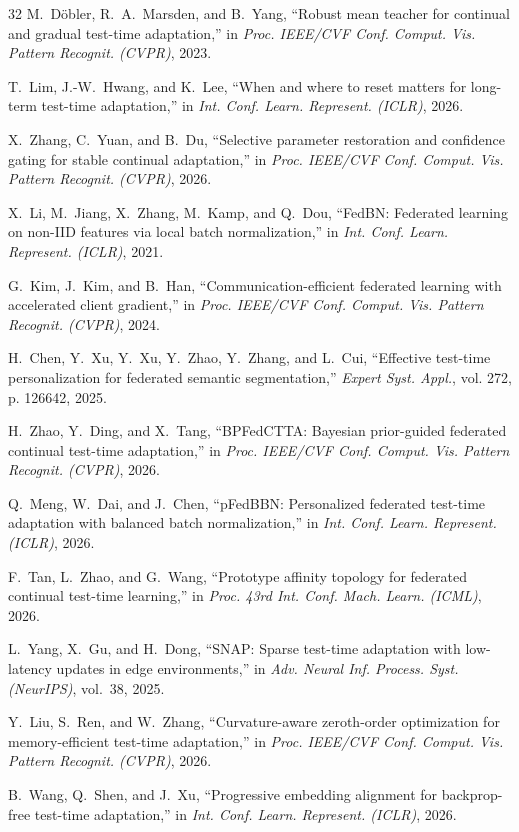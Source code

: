 \documentclass[journal]{IEEEtran}
\begin{document}
\begin{thebibliography}{32}
M.~D{\"o}bler, R.~A.~Marsden, and B.~Yang, ``Robust mean teacher for continual and gradual test-time adaptation,'' in \emph{Proc. IEEE/CVF Conf. Comput. Vis. Pattern Recognit. (CVPR)}, 2023.

T.~Lim, J.-W.~Hwang, and K.~Lee, ``When and where to reset matters for long-term test-time adaptation,'' in \emph{Int. Conf. Learn. Represent. (ICLR)}, 2026.

X.~Zhang, C.~Yuan, and B.~Du, ``Selective parameter restoration and confidence gating for stable continual adaptation,'' in \emph{Proc. IEEE/CVF Conf. Comput. Vis. Pattern Recognit. (CVPR)}, 2026.

X.~Li, M.~Jiang, X.~Zhang, M.~Kamp, and Q.~Dou, ``FedBN: Federated learning on non-IID features via local batch normalization,'' in \emph{Int. Conf. Learn. Represent. (ICLR)}, 2021.

G.~Kim, J.~Kim, and B.~Han, ``Communication-efficient federated learning with accelerated client gradient,'' in \emph{Proc. IEEE/CVF Conf. Comput. Vis. Pattern Recognit. (CVPR)}, 2024.

H.~Chen, Y.~Xu, Y.~Xu, Y.~Zhao, Y.~Zhang, and L.~Cui, ``Effective test-time personalization for federated semantic segmentation,'' \emph{Expert Syst. Appl.}, vol. 272, p. 126642, 2025.

H.~Zhao, Y.~Ding, and X.~Tang, ``BPFedCTTA: Bayesian prior-guided federated continual test-time adaptation,'' in \emph{Proc. IEEE/CVF Conf. Comput. Vis. Pattern Recognit. (CVPR)}, 2026.

Q.~Meng, W.~Dai, and J.~Chen, ``pFedBBN: Personalized federated test-time adaptation with balanced batch normalization,'' in \emph{Int. Conf. Learn. Represent. (ICLR)}, 2026.

F.~Tan, L.~Zhao, and G.~Wang, ``Prototype affinity topology for federated continual test-time learning,'' in \emph{Proc. 43rd Int. Conf. Mach. Learn. (ICML)}, 2026.

L.~Yang, X.~Gu, and H.~Dong, ``SNAP: Sparse test-time adaptation with low-latency updates in edge environments,'' in \emph{Adv. Neural Inf. Process. Syst. (NeurIPS)}, vol.~38, 2025.

Y.~Liu, S.~Ren, and W.~Zhang, ``Curvature-aware zeroth-order optimization for memory-efficient test-time adaptation,'' in \emph{Proc. IEEE/CVF Conf. Comput. Vis. Pattern Recognit. (CVPR)}, 2026.

B.~Wang, Q.~Shen, and J.~Xu, ``Progressive embedding alignment for backprop-free test-time adaptation,'' in \emph{Int. Conf. Learn. Represent. (ICLR)}, 2026.


\end{thebibliography}
\end{document}
